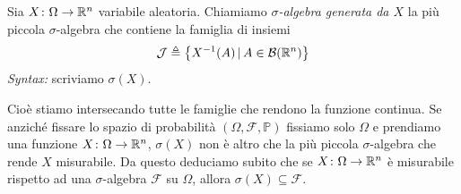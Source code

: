 \documentclass[a4paper]{article}
\begin{document}
\begin{snippetdefinition}{}
    Sia \(X \colon \Omega \to \mathbb{R}^n\) variabile aleatoria.
    Chiamiamo \emph{\(\sigma\)-algebra generata da \(X\)} la più piccola \(\sigma\)-algebra
    che contiene la famiglia di insiemi \[
        \mathcal J \triangleq \left\{
            X^{-1}(A) \,|\, A \in \mathcal B(\mathbb{R}^n)
        \right\}
    \]
    \emph{Syntax:} scriviamo \(\sigma(X)\).
\end{snippetdefinition}

Cioè stiamo intersecando tutte le famiglie che rendono la funzione continua.
Se anziché fissare lo spazio di probabilità
\((\Omega, \mathcal F, \mathbb P)\)
fissiamo solo \(\Omega\) e prendiamo una funzione
\(X \colon \Omega \to \mathbb{R}^n\), \(\sigma(X)\)
non è altro che la più piccola \(\sigma\)-algebra che rende \(X\)
misurabile.
Da questo deduciamo subito che se \(X \colon \Omega \to \mathbb{R}^n\)
è misurabile rispetto ad una \(\sigma\)-algebra \(\mathcal F\) su \(\Omega\), allora
\(\sigma(X) \subseteq \mathcal F\).
\end{document}
